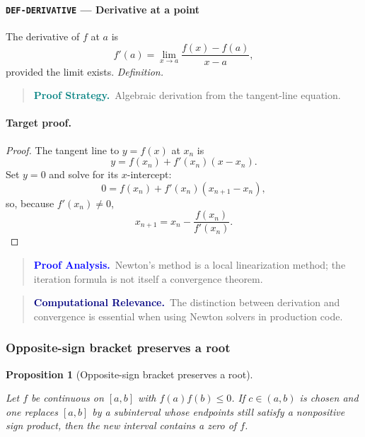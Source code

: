 \documentclass[10pt]{article}
\newcommand{\pidraw}[1]{\begingroup\urlstyle{tt}\nolinkurl{#1}\endgroup}
\newtheorem{proposition}[theorem]{Proposition}
\theoremstyle{definition}
\theoremstyle{remark}
\newenvironment{proofstrategy}
{\begin{quote}\small\noindent\textbf{\textcolor{teal}{Proof Strategy.}}\ }
{\end{quote}}
\newenvironment{proofanalysis}
{\begin{quote}\small\noindent\textbf{\textcolor{blue}{Proof Analysis.}}\ }
{\end{quote}}
\newenvironment{computationalrelevance}
{\begin{quote}\small\noindent\textbf{\textcolor{navy}{Computational Relevance.}}\ }
{\end{quote}}
\begin{document}
\paragraph{\pidraw{DEF-DERIVATIVE} --- Derivative at a point}
The derivative of $f$ at $a$ is
\[
f'(a)=\lim_{x\to a}\frac{f(x)-f(a)}{x-a},
\]
provided the limit exists.
\textit{Definition.}

\begin{proofstrategy}Algebraic derivation from the tangent-line equation.\end{proofstrategy}

\paragraph{Target proof.}

\begin{proof}

The tangent line to $y=f(x)$ at $x_n$ is
\[
y=f(x_n)+f'(x_n)(x-x_n).
\]
Set $y=0$ and solve for its $x$-intercept:
\[
0=f(x_n)+f'(x_n)(x_{n+1}-x_n),
\]
so, because $f'(x_n)\ne0$,
\[
x_{n+1}=x_n-\frac{f(x_n)}{f'(x_n)}.
\]

\end{proof}

\begin{proofanalysis}Newton's method is a local linearization method; the iteration formula is not itself a convergence theorem.\end{proofanalysis}

\begin{computationalrelevance}The distinction between derivation and convergence is essential when using Newton solvers in production code.\end{computationalrelevance}

\subsubsection{Opposite-sign bracket preserves a root}

\begin{proposition}[Opposite-sign bracket preserves a root]\label{prf:ALG-SIGN-BRACKET-INVARIANT}

Let $f$ be continuous on $[a,b]$ with $f(a)f(b)\le0$. If $c\in(a,b)$ is chosen and one replaces $[a,b]$ by a subinterval whose endpoints still satisfy a nonpositive sign product, then the new interval contains a zero of $f$.

\end{proposition}
\end{document}

